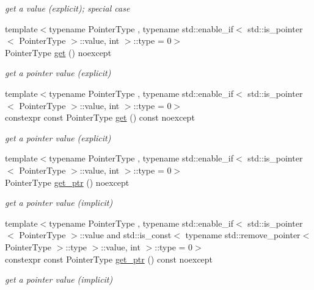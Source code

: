 \begin{DoxyCompactItemize}
\begin{DoxyCompactList}\small\item\em get a value (explicit); special case \end{DoxyCompactList}\item 
{\footnotesize template$<$typename Pointer\+Type , typename std\+::enable\+\_\+if$<$ std\+::is\+\_\+pointer$<$ Pointer\+Type $>$\+::value, int $>$\+::type  = 0$>$ }\\Pointer\+Type \mbox{\hyperlink{classnlohmann_1_1basic__json_a64135c19425f00b346d8ed63a23db334}{get}} () noexcept
\begin{DoxyCompactList}\small\item\em get a pointer value (explicit) \end{DoxyCompactList}\item 
{\footnotesize template$<$typename Pointer\+Type , typename std\+::enable\+\_\+if$<$ std\+::is\+\_\+pointer$<$ Pointer\+Type $>$\+::value, int $>$\+::type  = 0$>$ }\\constexpr const Pointer\+Type \mbox{\hyperlink{classnlohmann_1_1basic__json_a44a090c15a67b9f02e579b6e17ef0e1b}{get}} () const noexcept
\begin{DoxyCompactList}\small\item\em get a pointer value (explicit) \end{DoxyCompactList}\item 
{\footnotesize template$<$typename Pointer\+Type , typename std\+::enable\+\_\+if$<$ std\+::is\+\_\+pointer$<$ Pointer\+Type $>$\+::value, int $>$\+::type  = 0$>$ }\\Pointer\+Type \mbox{\hyperlink{classnlohmann_1_1basic__json_aefa46bd2d96bb77a38d1c8b431eab44f}{get\+\_\+ptr}} () noexcept
\begin{DoxyCompactList}\small\item\em get a pointer value (implicit) \end{DoxyCompactList}\item 
{\footnotesize template$<$typename Pointer\+Type , typename std\+::enable\+\_\+if$<$ std\+::is\+\_\+pointer$<$ Pointer\+Type $>$\+::value and std\+::is\+\_\+const$<$ typename std\+::remove\+\_\+pointer$<$ Pointer\+Type $>$\+::type $>$\+::value, int $>$\+::type  = 0$>$ }\\constexpr const Pointer\+Type \mbox{\hyperlink{classnlohmann_1_1basic__json_a14abd48803a8d5447faf5f583fa8e2a1}{get\+\_\+ptr}} () const noexcept
\begin{DoxyCompactList}\small\item\em get a pointer value (implicit) \end{DoxyCompactList}\item 

\end{DoxyCompactItemize}
